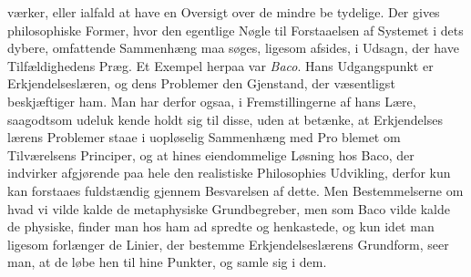 %
værker, eller ialfald at have en Oversigt over de mindre be\-%
tydelige. Der gives philosophiske Former, hvor den egentlige
Nøgle til Forstaaelsen af Systemet i dets dybere, omfattende
Sammenhæng maa søges, ligesom afsides, i Udsagn, der have
Tilfældighedens Præg. Et Exempel herpaa var \emph{Baco}. Hans
Udgangspunkt er Erkjendelseslæren, og dens Problemer den
Gjenstand, der væsentligst beskjæftiger ham. Man har derfor
ogsaa, i Fremstillingerne af hans Lære, saagodtsom udeluk\-%
kende holdt sig til disse, uden at betænke, at Erkjendelses\-%
lærens Problemer staae i uopløselig Sammenhæng med Pro\-%
blemet om Tilværelsens Principer, og at hines eiendommelige
Løsning hos Baco, der indvirker afgjørende paa hele den
realistiske Philosophies Udvikling, derfor kun kan forstaaes
fuldstændig gjennem Besvarelsen af dette. Men Bestemmelserne
om hvad vi vilde kalde de metaphysiske Grundbegreber, men
som Baco vilde kalde de physiske, finder man hos ham ad\-%
spredte og henkastede, og kun idet man ligesom forlænger de
Linier, der bestemme Erkjendelseslærens Grundform, seer man,
at de løbe hen til hine Punkter, og samle sig i dem.

